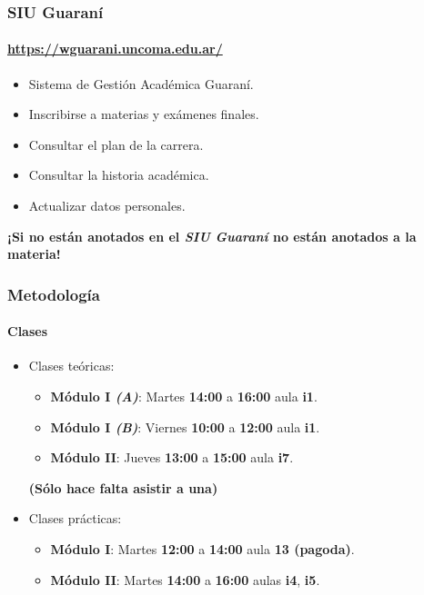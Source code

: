 \documentclass[11pt,a4paper,spanish]{beamer}
\begin{document}
\begin{frame}

    \frametitle{SIU Guaraní}
    \framesubtitle{\url{https://wguarani.uncoma.edu.ar/}}

\begin{itemize}
    \item Sistema de Gestión Académica Guaraní.
    \item Inscribirse a materias y exámenes finales.
    \item Consultar el plan de la carrera.
    \item Consultar la historia académica.
    \item Actualizar datos personales.
\end{itemize}

\textbf{¡Si no están anotados en el \emph{SIU Guaraní} no están anotados a la
    materia!}

\end{frame}

\begin{frame}

    \frametitle{Metodología}
    \framesubtitle{Clases}

\begin{itemize}
    \item Clases teóricas:
    \begin{itemize}
        \item \textbf{Módulo I \emph{(A)}}: Martes \textbf{14:00} a
            \textbf{16:00} aula \textbf{i1}.
        \item \textbf{Módulo I \emph{(B)}}: Viernes \textbf{10:00} a
            \textbf{12:00} aula \textbf{i1}.
        \item \textbf{Módulo II}: Jueves \textbf{13:00} a \textbf{15:00} aula
            \textbf{i7}.
    \end{itemize}
        \textbf{(Sólo hace falta asistir a una)}
    \item Clases prácticas:
    \begin{itemize}
        \item \textbf{Módulo I}: Martes \textbf{12:00} a \textbf{14:00} aula
            \textbf{13 (pagoda)}.
        \item \textbf{Módulo II}: Martes \textbf{14:00} a \textbf{16:00} aulas
            \textbf{i4}, \textbf{i5}.
    \end{itemize}

\end{itemize}

\end{frame}
\end{document}
